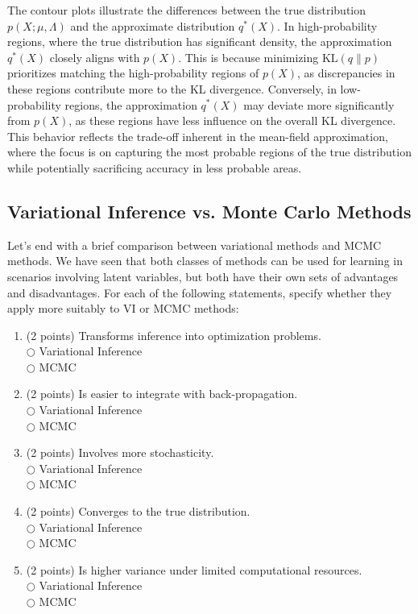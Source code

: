 \documentclass[a3paper,12pt]{extarticle} %
\begin{document}
\begin{enumerate}
    The contour plots illustrate the differences between the true distribution \( p(X; \mu, \Lambda) \) and the approximate distribution \( q^*(X) \). In high-probability regions, where the true distribution has significant density, the approximation \( q^*(X) \) closely aligns with \( p(X) \). This is because minimizing \( \text{KL}(q \| p) \) prioritizes matching the high-probability regions of \( p(X) \), as discrepancies in these regions contribute more to the KL divergence. Conversely, in low-probability regions, the approximation \( q^*(X) \) may deviate more significantly from \( p(X) \), as these regions have less influence on the overall KL divergence. This behavior reflects the trade-off inherent in the mean-field approximation, where the focus is on capturing the most probable regions of the true distribution while potentially sacrificing accuracy in less probable areas.
\end{enumerate}

\subsection{Variational Inference vs. Monte Carlo Methods}

Let’s end with a brief comparison between variational methods and MCMC methods. We have seen that both
classes of methods can be used for learning in scenarios involving latent variables, but both have their own sets of
advantages and disadvantages. For each of the following statements, specify whether they apply more suitably to
VI or MCMC methods:

\begin{enumerate}
    \item (2 points) Transforms inference into optimization problems.\\
    \(\bigcirc\) Variational Inference \\
    \(\bigcirc\) MCMC
    \item (2 points) Is easier to integrate with back-propagation.\\
    \(\bigcirc\) Variational Inference \\
    \(\bigcirc\) MCMC
    \item (2 points) Involves more stochasticity.\\
    \(\bigcirc\) Variational Inference \\
    \(\bigcirc\) MCMC
    \item (2 points) Converges to the true distribution.\\
    \(\bigcirc\) Variational Inference \\
    \(\bigcirc\) MCMC
    \item (2 points) Is higher variance under limited computational resources.\\
    \(\bigcirc\) Variational Inference \\
    \(\bigcirc\) MCMC
\end{enumerate}
\end{document}
